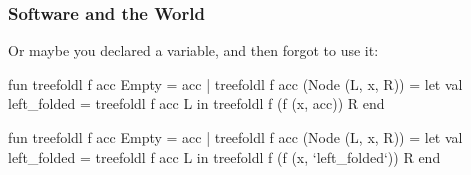 \documentclass[aspectratio=169]{beamer}
\newcommand{\cmark}{{\color{green!80!black}\ding{51}}}
\newcommand{\xmark}{{\color{red}\ding{55}}}
\begin{document}
\begin{frame}[fragile]
  \frametitle{Software and the World}

  Or maybe you declared a variable, and then forgot to use it:

  \begin{center}
    \begin{minipage}[t][1.4in][t]{\textwidth}
      \begin{minipage}{0.2\textwidth}
        \centering
        \xmark
      \end{minipage}
      \begin{minipage}{0.75\textwidth}
        {\small
          \begin{codeblock}[rulecolor=\color{red}, framerule=0.3mm]
            fun treefoldl f acc Empty = acc
              | treefoldl f acc (Node (L, x, R)) =
                  let
                    val left_folded = treefoldl f acc L
                  in
                    treefoldl f (f (x, acc)) R
                  end
          \end{codeblock}
          }
        \end{minipage}
    \end{minipage}
    \begin{minipage}[t][1.4in][t]{\textwidth}
      \begin{minipage}{0.2\textwidth}
        \centering
        \cmark
      \end{minipage}
      \begin{minipage}{0.75\textwidth}
        {\small
        \begin{codeblock}[rulecolor=\color{green!80!black}, framerule=0.3mm]
          fun treefoldl f acc Empty = acc
            | treefoldl f acc (Node (L, x, R)) =
                let
                  val left_folded = treefoldl f acc L
                in
                  treefoldl f (f (x, `left_folded`)) R
                end
        \end{codeblock}
        }
      \end{minipage}
    \end{minipage}
  \end{center}
\end{frame}
\end{document}

